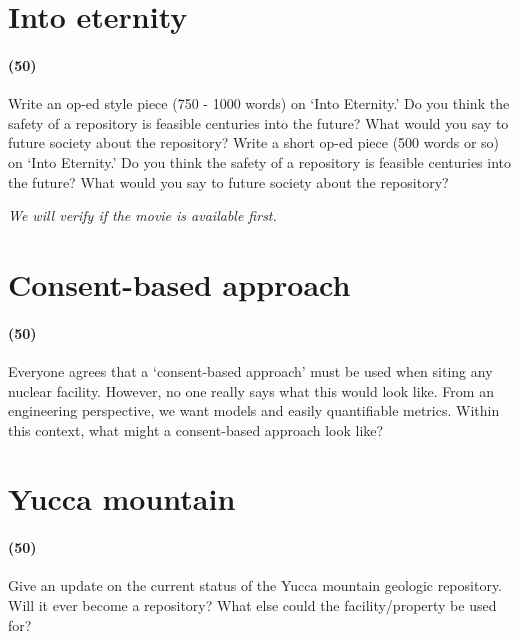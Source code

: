 \documentclass[11pt,a4paper]{article}
\begin{document}
\newpage

\section{Into eternity}
\paragraph*{(50)}
Write an op-ed style piece (750 - 1000 words) on `Into Eternity.' Do you think the safety of a repository is feasible centuries into the future? What would you say to future society about the repository? Write a short op-ed piece (500 words or so) on ‘Into Eternity.’ Do you think the safety of a repository is feasible centuries into the future? What would you say to future society about the repository?

\vspace{\baselineskip}

\noindent\textit{We will verify if the movie is available first.}





\newpage

\section{Consent-based approach}
\paragraph*{(50)}
Everyone agrees that a `consent-based approach' must be used when siting any nuclear facility. However, no one really says what this would look like. From an engineering perspective, we want models and easily quantifiable metrics. Within this context, what might a consent-based approach look like?





\newpage

\section{Yucca mountain}
\paragraph*{(50)}
Give an update on the current status of the Yucca mountain geologic repository. Will it ever become a repository? What else could the facility/property be used for?
\end{document}
